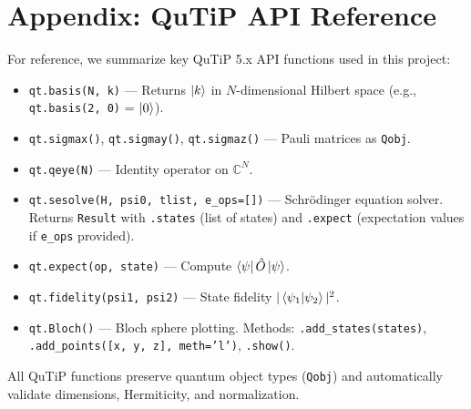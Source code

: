 \documentclass[11pt,a4paper]{article}
\theoremstyle{definition}
\theoremstyle{remark}
\newcommand{\CC}{\mathbb{C}}
\begin{document}
\appendix
\section{Appendix: QuTiP API Reference}
\label{app:qutip}

For reference, we summarize key QuTiP 5.x API functions used in this project:

\begin{itemize}
    \item \texttt{qt.basis(N, k)} — Returns $\ket{k}$ in $N$-dimensional Hilbert space (e.g., \texttt{qt.basis(2, 0)} = $\ket{0}$).
    \item \texttt{qt.sigmax()}, \texttt{qt.sigmay()}, \texttt{qt.sigmaz()} — Pauli matrices as \texttt{Qobj}.
    \item \texttt{qt.qeye(N)} — Identity operator on $\CC^N$.
    \item \texttt{qt.sesolve(H, psi0, tlist, e\_ops=[])} — Schrödinger equation solver. Returns \texttt{Result} with \texttt{.states} (list of states) and \texttt{.expect} (expectation values if \texttt{e\_ops} provided).
    \item \texttt{qt.expect(op, state)} — Compute $\bra{\psi} \hat{O} \ket{\psi}$.
    \item \texttt{qt.fidelity(psi1, psi2)} — State fidelity $|\braket{\psi_1}{\psi_2}|^2$.
    \item \texttt{qt.Bloch()} — Bloch sphere plotting. Methods: \texttt{.add\_states(states)}, \texttt{.add\_points([x, y, z], meth='l')}, \texttt{.show()}.
\end{itemize}

All QuTiP functions preserve quantum object types (\texttt{Qobj}) and automatically validate dimensions, Hermiticity, and normalization.
\end{document}
